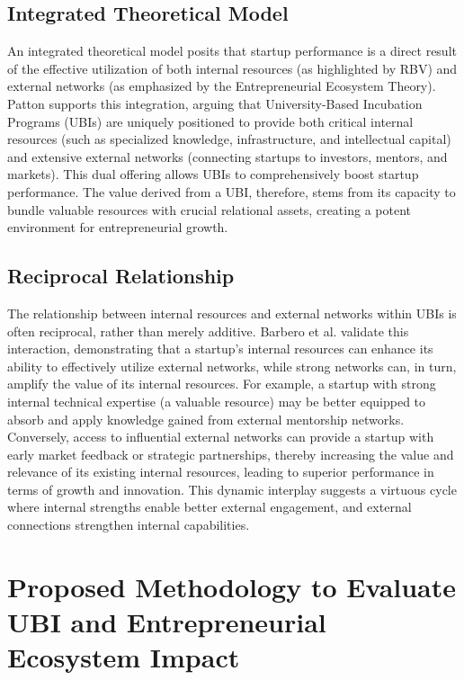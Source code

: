 \documentclass[../Main.tex]{subfiles}
\begin{document}
\subsection{Integrated Theoretical Model}
An integrated theoretical model posits that startup performance is a direct result of the effective utilization of both internal resources (as highlighted by RBV) and external networks (as emphasized by the Entrepreneurial Ecosystem Theory). Patton \cite{patton2014realising} supports this integration, arguing that University-Based Incubation Programs (UBIs) are uniquely positioned to provide both critical internal resources (such as specialized knowledge, infrastructure, and intellectual capital) and extensive external networks (connecting startups to investors, mentors, and markets). This dual offering allows UBIs to comprehensively boost startup performance. The value derived from a UBI, therefore, stems from its capacity to bundle valuable resources with crucial relational assets, creating a potent environment for entrepreneurial growth.

\subsection{Reciprocal Relationship}
The relationship between internal resources and external networks within UBIs is often reciprocal, rather than merely additive. Barbero et al. \cite{barbero2012revisiting} validate this interaction, demonstrating that a startup's internal resources can enhance its ability to effectively utilize external networks, while strong networks can, in turn, amplify the value of its internal resources. For example, a startup with strong internal technical expertise (a valuable resource) may be better equipped to absorb and apply knowledge gained from external mentorship networks. Conversely, access to influential external networks can provide a startup with early market feedback or strategic partnerships, thereby increasing the value and relevance of its existing internal resources, leading to superior performance in terms of growth and innovation. This dynamic interplay suggests a virtuous cycle where internal strengths enable better external engagement, and external connections strengthen internal capabilities.

\section{Proposed Methodology to Evaluate UBI and Entrepreneurial Ecosystem Impact}
\end{document}
